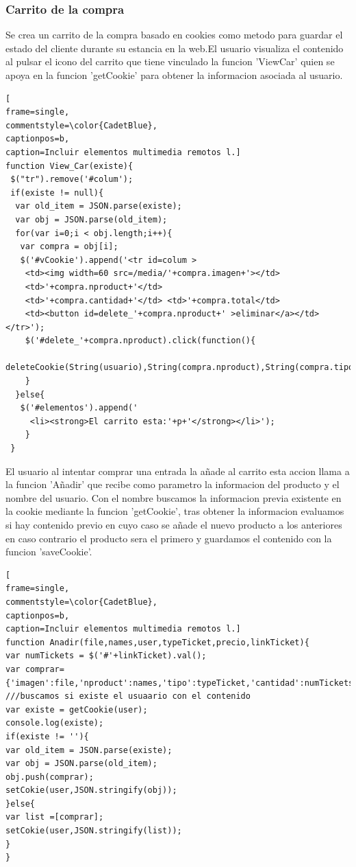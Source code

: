 \subsubsection{Carrito de la compra}
Se crea un carrito de la compra basado en cookies como metodo para guardar el estado del cliente durante su estancia en la web.El usuario visualiza el contenido al pulsar el icono del carrito que tiene vinculado la funcion 'ViewCar' quien se apoya en la funcion 'getCookie' para obtener la informacion asociada al usuario.
\lstset{language=, breaklines=true, basicstyle=\footnotesize}
\begin{lstlisting}[
frame=single,
commentstyle=\color{CadetBlue},
captionpos=b,
caption=Incluir elementos multimedia remotos l.]
function View_Car(existe){
 $("tr").remove('#colum');
 if(existe != null){
  var old_item = JSON.parse(existe);
  var obj = JSON.parse(old_item);
  for(var i=0;i < obj.length;i++){
   var compra = obj[i];
   $('#vCookie').append('<tr id=colum >
    <td><img width=60 src=/media/'+compra.imagen+'></td>
    <td>'+compra.nproduct+'</td>
    <td>'+compra.cantidad+'</td> <td>'+compra.total</td>
    <td><button id=delete_'+compra.nproduct+' >eliminar</a></td></tr>');
    $('#delete_'+compra.nproduct).click(function(){
          deleteCookie(String(usuario),String(compra.nproduct),String(compra.tipo))});
    }
  }else{
   $('#elementos').append('
     <li><strong>El carrito esta:'+p+'</strong></li>');
    }
 }
\end{lstlisting}    
El usuario al intentar comprar una entrada la añade al carrito esta accion llama a la funcion 'Añadir' que recibe como parametro la informacion del producto y el nombre del usuario. Con el nombre buscamos la informacion previa existente en la cookie mediante la funcion 'getCookie', tras  obtener la informacion evaluamos si hay contenido previo en cuyo caso se añade el nuevo producto a los anteriores en caso contrario el producto sera el primero  y  guardamos  el  contenido con la funcion 'saveCookie'.
\begin{lstlisting}[
frame=single,
commentstyle=\color{CadetBlue},
captionpos=b,
caption=Incluir elementos multimedia remotos l.]
function Anadir(file,names,user,typeTicket,precio,linkTicket){
var numTickets = $('#'+linkTicket).val();
var comprar={'imagen':file,'nproduct':names,'tipo':typeTicket,'cantidad':numTickets,'total':parseInt(precio)*numTickets};     
///buscamos si existe el usuaario con el contenido
var existe = getCookie(user);
console.log(existe);
if(existe != ''){
var old_item = JSON.parse(existe);
var obj = JSON.parse(old_item);
obj.push(comprar);
setCokie(user,JSON.stringify(obj));
}else{
var list =[comprar];
setCokie(user,JSON.stringify(list));
}
}
\end{lstlisting}  
